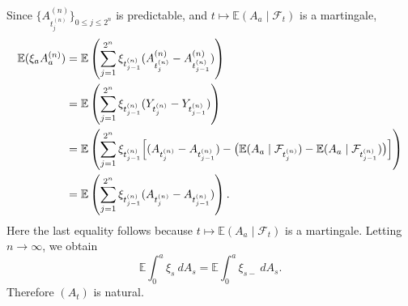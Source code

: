 {    Since $\{A_{t_{j}^{(n)}}^{(n)}\}_{0 \leq j \leq 2^n}$ is predictable, and $t \mapsto \mathbb{E}(A_a \mid \mathcal{F}_t)$ is a martingale,
    $$
    \begin{aligned}
        \mathbb{E}(\xi_a A_a^{(n)})
        &= \mathbb{E}\left( \sum_{j=1}^{2^n}\xi_{t_{j-1}^{(n)}} (A_{t_{j}^{(n)}}^{(n)} - A_{t_{j-1}^{(n)}}^{(n)}) \right)\\
        &= \mathbb{E}\left( \sum_{j=1}^{2^n}\xi_{t_{j-1}^{(n)}}(Y_{t_{j}^{(n)}}-Y_{t_{j-1}^{(n)}}) \right)\\
        &= \mathbb{E}\left( \sum_{j=1}^{2^n}\xi_{t_{j-1}^{(n)}}\Bigl[(A_{t_{j}^{(n)}}-A_{t_{j-1}^{(n)}}) - \bigl(\mathbb{E}(A_a \mid \mathcal{F}_{t_j^{(n)}})-\mathbb{E}(A_a \mid \mathcal{F}_{t_{j-1}^{(n)}})\bigr)\Bigr] \right)\\
        &= \mathbb{E}\left( \sum_{j=1}^{2^n}\xi_{t_{j-1}^{(n)}}(A_{t_{j}^{(n)}}-A_{t_{j-1}^{(n)}}) \right).
    \end{aligned}
    $$
    Here the last equality follows because $t \mapsto \mathbb{E}(A_a \mid \mathcal{F}_t)$ is a martingale.
    Letting $n \to \infty$, we obtain
    $$
        \mathbb{E}\int_{0}^{a} \xi_s ~dA_s = \mathbb{E}\int_{0}^{a}\xi_{s-}~dA_s.
    $$
    Therefore $(A_t)$ is natural.
}

